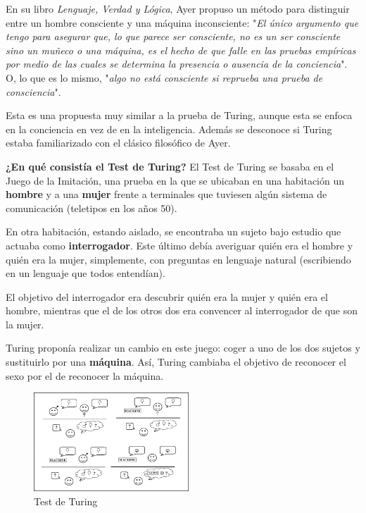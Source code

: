 \documentclass[a4paper, 11pt]{article} %
\begin{document}
\begin{itemize}
    En su libro \textit{Lenguaje, Verdad y Lógica}, Ayer propuso un método para distinguir entre un hombre consciente y una máquina inconsciente: "\textit{El único argumento que tengo para asegurar que, lo que parece ser consciente, no es un ser consciente sino un muñeco o una máquina, es el hecho de que falle en las pruebas empíricas por medio de las cuales se determina la presencia o ausencia de la conciencia}". O, lo que es lo mismo, "\textit{algo no está consciente si reprueba una prueba de consciencia}".
    
    Esta es una propuesta muy similar a la prueba de Turing, aunque esta se enfoca en la conciencia en vez de en la inteligencia. Además se desconoce si Turing estaba familiarizado con el clásico filosófico de Ayer.\\ 
\end{itemize}

\textbf{¿En qué consistía el Test de Turing?} El Test de Turing se basaba en el Juego de la Imitación, una prueba en la que se ubicaban en una habitación un \textbf{hombre} y a una \textbf{mujer} frente a terminales que tuviesen algún sistema de comunicación (teletipos en los años 50).

En otra habitación, estando aislado, se encontraba un sujeto bajo estudio que actuaba como \textbf{interrogador}. Este último debía averiguar quién era el hombre y quién era la mujer, simplemente, con preguntas en lenguaje natural (escribiendo en un lenguaje que todos entendían).

El objetivo del interrogador era descubrir quién era la mujer y quién era el hombre, mientras que el de los otros dos era convencer al interrogador de que son la mujer.

Turing proponía realizar un cambio en este juego: coger a uno de los dos sujetos y sustituirlo por una \textbf{máquina}. Así, Turing cambiaba el objetivo de reconocer el sexo por el de reconocer la máquina.

\begin{figure}[H]
\centering
\includegraphics[width=0.52\textwidth]{testdeturing.PNG}
\caption{Test de Turing}
\label{Test de Turing}
\end{figure}
\end{document}
